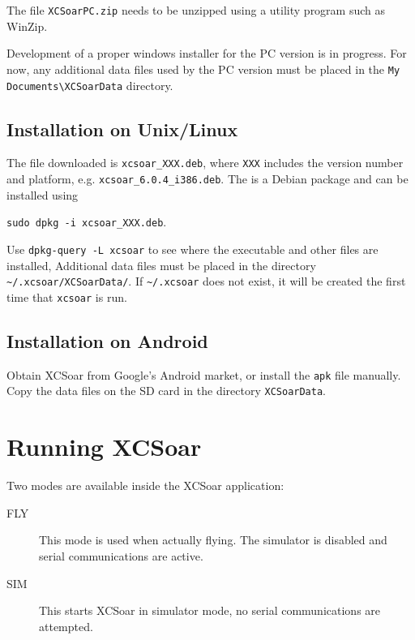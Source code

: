 The file \verb|XCSoarPC.zip| needs to be unzipped using a utility
program such as WinZip.

Development of a proper windows installer for the PC version is in
progress.  For now, any additional data files used by the PC version
must be placed in the \verb|My Documents\XCSoarData| directory.


\subsection*{Installation on Unix/Linux}

The file downloaded is \verb|xcsoar_XXX.deb|, where \verb|XXX| includes
the version number and platform, e.g. \verb|xcsoar_6.0.4_i386.deb|.
The is a Debian package and can be installed using 
\begin{center}
\verb|sudo dpkg -i xcsoar_XXX.deb|.
\end{center}
Use \verb|dpkg-query -L xcsoar| to see where the executable and 
other files are installed,
Additional data files must be placed in the directory
\verb|~/.xcsoar/XCSoarData/|.
If \verb|~/.xcsoar| does not exist, it will be created the first time
that \verb|xcsoar| is run.


\subsection*{Installation on Android}

Obtain XCSoar from Google's Android market, or install the \verb|apk|
file manually.  Copy the data files on the SD card in the directory
\verb|XCSoarData|.


\section{Running XCSoar}

Two modes are available inside the XCSoar application: 
\begin{description}
\item[FLY] This mode is used when actually flying.  The simulator is 
  disabled and serial communications are active. 
\item[SIM] This starts XCSoar in simulator mode, no serial communications
  are attempted.
\end{description}

